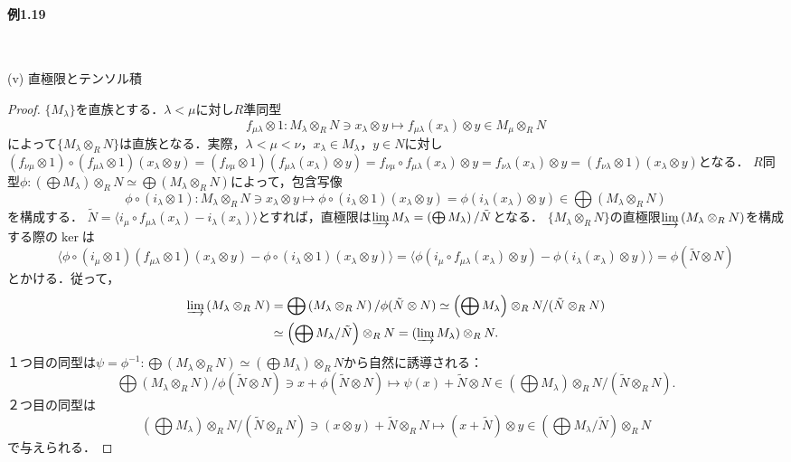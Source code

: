 \paragraph{例1.19}~
\begin{screen}
  (v) 直極限とテンソル積
\end{screen}
\begin{proof}
  $\{M_\lambda\}$を直族とする．$\lambda < \mu$に対し$R$準同型
  \[f_{\mu\lambda} \otimes 1 \colon M_\lambda \otimes_R N \ni x_\lambda \otimes y \mapsto f_{\mu\lambda}(x_\lambda) \otimes y \in M_\mu \otimes_R N\]
  によって$\{M_\lambda \otimes_R N\}$は直族となる．実際，$\lambda < \mu < \nu$，$x_\lambda \in M_\lambda$，$y \in N$に対し$(f_{\nu\mu} \otimes 1) \circ (f_{\mu\lambda} \otimes 1) (x_\lambda \otimes y) = (f_{\nu\mu} \otimes 1)(f_{\mu\lambda}(x_\lambda) \otimes y) = f_{\nu\mu} \circ f_{\mu\lambda} (x_\lambda) \otimes y = f_{\nu\lambda}(x_\lambda) \otimes y = (f_{\nu\lambda} \otimes 1)(x_\lambda \otimes y)$となる．
  $R$同型$\phi\colon (\bigoplus M_\lambda) \otimes_R N \simeq \bigoplus(M_\lambda \otimes_R N)$によって，包含写像
  \[\phi \circ (i_\lambda \otimes 1)\colon M_\lambda \otimes_R N \ni x_\lambda \otimes y \mapsto \phi \circ (i_\lambda \otimes 1)(x_\lambda \otimes y) = \phi (i_\lambda(x_\lambda) \otimes y) \in \bigoplus(M_\lambda \otimes_R N)\]
  を構成する．
  $\tilde{N} = \langle i_\mu \circ f_{\mu\lambda} (x_\lambda) - i_\lambda (x_\lambda) \rangle$とすれば，直極限は$\varinjlim M_\lambda = \left( \bigoplus M_\lambda \right) / \tilde{N}$となる．
  $\{M_\lambda \otimes_R N\}$の直極限$\varinjlim \left( M_\lambda \otimes_R N \right)$を構成する際の$\ker$は
  \[\langle \phi \circ (i_\mu \otimes 1)(f_{\mu\lambda} \otimes 1)(x_\lambda \otimes y) - \phi \circ (i_\lambda \otimes 1)(x_\lambda \otimes y) \rangle = \langle \phi (i_\mu \circ f_{\mu\lambda}(x_\lambda) \otimes y) - \phi (i_\lambda (x_\lambda) \otimes y) \rangle = \phi (\tilde{N} \otimes N) \]
  とかける．従って，
  \begin{align*}
    \varinjlim \left( M_\lambda \otimes_R N \right) &= \bigoplus \left( M_\lambda \otimes_R N \right) / \phi (\tilde{N} \otimes N) \simeq \left( \bigoplus M_\lambda \right) \otimes_R N / (\tilde{N} \otimes_R N) \\
    & \simeq \left( \bigoplus M_\lambda / \tilde{N} \right) \otimes_R N = (\varinjlim M_\lambda) \otimes_R N.
  \end{align*}
  １つ目の同型は$\psi = \phi^{-1} \colon \bigoplus(M_\lambda \otimes_R N) \simeq (\bigoplus M_\lambda) \otimes_R N$から自然に誘導される：
  \[ \bigoplus \left( M_\lambda \otimes_R N \right) / \phi (\tilde{N} \otimes N) \ni x + \phi (\tilde{N} \otimes N) \mapsto \psi(x) + \tilde{N} \otimes N \in \left( \bigoplus M_\lambda \right) \otimes_R N / (\tilde{N} \otimes_R N).\]
  ２つ目の同型は
  \[\left( \bigoplus M_\lambda \right) \otimes_R N / (\tilde{N} \otimes_R N) \ni (x \otimes y) + \tilde{N} \otimes_R N \mapsto (x + \tilde{N}) \otimes y \in \left( \bigoplus M_\lambda / \tilde{N} \right) \otimes_R N \]
  で与えられる．
\end{proof}

